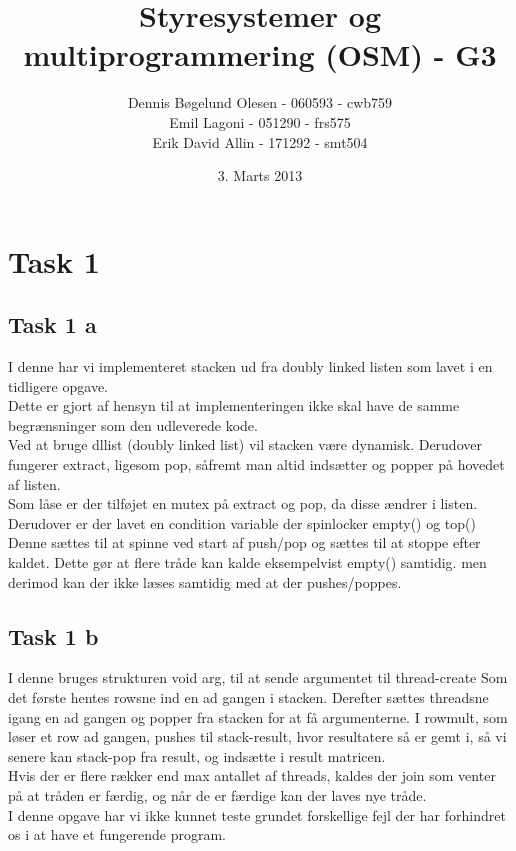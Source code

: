 \documentclass[a4paper,12pt]{article}
\title{Styresystemer og multiprogrammering (OSM) - G3}
\author{Dennis Bøgelund Olesen - 060593 - cwb759 \\ Emil Lagoni - 051290 - frs575 \\ Erik David Allin - 171292 - smt504}
\date{3. Marts 2013}
\begin{document}
\maketitle %
\thispagestyle{empty}
\setcounter{page}{0}
\newpage




\section*{Task 1}
\subsection*{Task 1 a}
I denne har vi implementeret stacken ud fra doubly linked listen som lavet i 
en tidligere opgave. \\
Dette er gjort af hensyn til at implementeringen ikke skal have de samme begrænsninger som den udleverede kode. \\
Ved at bruge dllist (doubly linked list) vil stacken være dynamisk. 
Derudover fungerer extract, ligesom pop, såfremt man
altid indsætter og popper på hovedet af listen.
\\
Som låse er der tilføjet en mutex på extract og pop, da disse ændrer i listen.
Derudover er der lavet en condition variable der spinlocker empty() og top()
Denne sættes til at spinne ved start af push/pop og sættes til at stoppe efter kaldet. 
Dette gør at flere tråde kan kalde eksempelvist empty() samtidig. 
men derimod kan der ikke læses samtidig med at der pushes/poppes.
\\

\subsection*{Task 1 b}
I denne bruges strukturen void\* arg, til at sende argumentet til thread-create
Som det første hentes rowsne ind en ad gangen i stacken.
Derefter sættes threadsne igang en ad gangen og popper fra stacken for at få 
argumenterne. I rowmult, som løser et row ad gangen, pushes til stack-result,
hvor resultatere så er gemt i, så vi senere kan stack-pop fra result, og indsætte
i result matricen. \\
Hvis der er flere rækker end max antallet af threads, kaldes der join som venter
på at tråden er færdig, og når de er færdige kan der laves nye tråde.
\\
I denne opgave har vi ikke kunnet teste grundet forskellige fejl der har
forhindret os i at have et fungerende program. 
\end{document}
